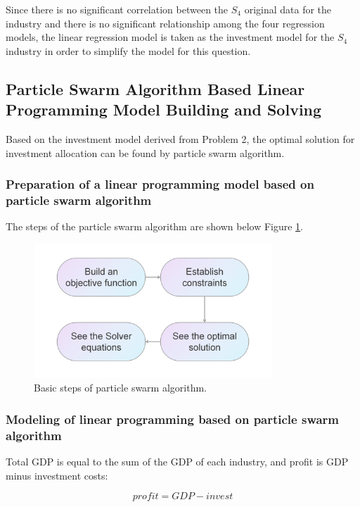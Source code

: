 \documentclass[12pt]{article}  %
\begin{document}
	Since there is no significant correlation between the $S_4$ original data for the  industry and there is no significant relationship among the four regression models, the linear regression model is taken as the investment model for the $S_4$ industry in order to simplify the model for this question.

\subsection{Particle Swarm Algorithm Based Linear Programming Model Building and Solving}
	Based on the investment model derived from Problem 2, the optimal solution for investment allocation can be found by particle swarm algorithm.
	
	\subsubsection{ Preparation of a linear programming model based on particle swarm algorithm}
		The steps of the particle swarm algorithm are shown below Figure \ref{figss}.
		
		\begin{figure}[H] %
			\centering
			\includegraphics[width=0.8\textwidth]{img/liziqun} %
			\caption{Basic steps of particle swarm algorithm.} %
			\label{figss} %
		\end{figure}
		
		
	\subsubsection{Modeling of linear programming based on particle swarm algorithm}
		Total GDP is equal to the sum of the GDP of each industry, and profit is GDP minus investment costs:

		\begin{equation}
			profit = GDP - invest
		\end{equation}
\end{document}
